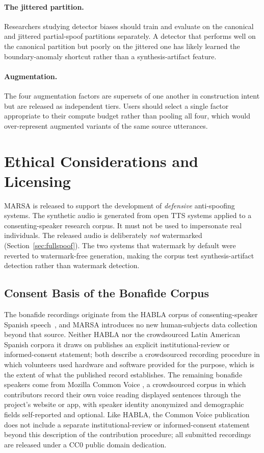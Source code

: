 \documentclass[11pt]{report}
\begin{document}
\paragraph{The jittered partition.} Researchers studying detector
biases should train and evaluate on the canonical and jittered
partial-spoof partitions separately. A detector that performs well on
the canonical partition but poorly on the jittered one has likely
learned the boundary-anomaly shortcut rather than a synthesis-artifact
feature.

\paragraph{Augmentation.} The four augmentation factors are supersets
of one another in construction intent but are released as independent
tiers. Users should select a single factor appropriate to their
compute budget rather than pooling all four, which would
over-represent augmented variants of the same source utterances.

\section{Ethical Considerations and Licensing}

MARSA is released to support the development of \emph{defensive}
anti-spoofing systems. The synthetic audio is generated from open TTS
systems applied to a consenting-speaker research corpus. It must not be
used to impersonate real individuals. The released audio is
deliberately \emph{not} watermarked (Section~\ref{sec:fullspoof}). The
two systems that watermark by default were reverted to watermark-free
generation, making the corpus test synthesis-artifact detection rather
than watermark detection.

\subsection{Consent Basis of the Bonafide Corpus}

The bonafide recordings originate from the HABLA corpus of
consenting-speaker Spanish speech~\citep{habla}, and MARSA introduces
no new human-subjects data collection beyond that source. Neither
HABLA nor the crowdsourced Latin American Spanish corpora it draws on
\citep{guevararukoz2020crowdsourcing} publishes an explicit
institutional-review or informed-consent statement; both describe a
crowdsourced recording procedure in which volunteers used hardware and
software provided for the purpose, which is the extent of what the
published record establishes. The remaining bonafide speakers come
from Mozilla Common Voice \citep{commonvoice}, a crowdsourced corpus in
which contributors record their own voice reading displayed sentences
through the project's website or app, with speaker identity anonymized
and demographic fields self-reported and optional. Like HABLA, the
Common Voice publication does not include a separate
institutional-review or informed-consent statement beyond this
description of the contribution procedure; all submitted recordings
are released under a CC0 public domain dedication.
\end{document}
